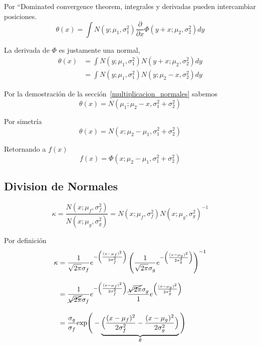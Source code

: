 \documentclass[article]{jss}
\begin{document}
\begin{appendix}
Por ``Dominated convergence theorem, integrales y derivadas pueden intercambiar posiciones.
\begin{equation}
 \theta(x) = \int N(y;\mu_1,\sigma_1^2)\frac{\partial}{\partial x}\Phi(y+x;\mu_2,\sigma_2^2) dy
\end{equation}

La derivada de $\Phi$ es justamente una normal,
\begin{equation}
\begin{split}
\theta(x) & = \int N(y;\mu_1,\sigma_1^2)N(y+x;\mu_2,\sigma_2^2) dy \\
& = \int N(y;\mu_1,\sigma_1^2)N(y;\mu_2-x,\sigma_2^2) dy
\end{split}
\end{equation}

Por la demostraci\'on de la secci\'on~\ref{multiplicacion_normales} sabemos
\begin{equation}
 \theta(x) = N(\mu_1; \mu_2 - x, \sigma_1^2 + \sigma_2^2)
\end{equation}

Por simetr\'ia
\begin{equation}
 \theta(x) = N(x; \mu_2 - \mu_1, \sigma_1^2 + \sigma_2^2)
\end{equation}

Retornando a $f(x)$
\begin{equation}
 f(x) = \Phi(x; \mu_2 - \mu_1, \sigma_1^2 + \sigma_2^2)
\end{equation}

\subsection{Division de Normales}\label{sec:division_normales}

\begin{equation}
\kappa = \frac{N(x;\mu_f,\sigma_f^2)}{N(x;\mu_g,\sigma_g^2)} = N(x;\mu_f,\sigma_f^2)N(x;\mu_g,\sigma_g^2)^{-1}
\end{equation}

Por definici\'on
\begin{equation}
\begin{split}
\kappa & = \frac{1}{\sqrt{2\pi}\sigma_f}e^{-\left(\frac{(x-\mu_f)^2}{2\sigma_f^2}\right)} \left( \frac{1}{\sqrt{2\pi}\sigma_g}e^{-\left(\frac{(x-\mu_g)^2}{2\sigma_g^2}\right)} \right)^{-1} \\[0.3cm]
& = \frac{1}{\cancel{\sqrt{2\pi}}\sigma_f}e^{-\left(\frac{(x-\mu_f)^2}{2\sigma_f^2}\right)} \frac{\cancel{\sqrt{2\pi}}\sigma_g}{1} e^{\left(\frac{(x-\mu_g)^2}{2\sigma_g^2}\right)} \\[0.3cm]
& = \frac{\sigma_g}{\sigma_f}\text{exp}\Bigg(-\underbrace{\Big(\frac{(x-\mu_f)^2}{2\sigma_f^2} - \frac{(x-\mu_g)^2}{2\sigma_g^2}\Big)}_{\theta}\Bigg)
\end{split}
\end{equation}


\end{appendix}
\end{document}
